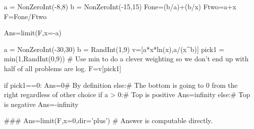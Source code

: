 
\begin{sagesilent}
a = NonZeroInt(-8,8)
b = NonZeroInt(-15,15)
Fone=(b/a)+(b/x)
Ftwo=a+x
F=Fone/Ftwo

Ans=limit(F,x=-a)
\end{sagesilent}



\begin{sagesilent}
a = NonZeroInt(-30,30)
b = RandInt(1,9)
v=[a*x*ln(x),a/(x^b)]
pick1 = min(1,RandInt(0,9)) # Use min to do a clever weighting so we don't end up with half of all problems are log.
F=v[pick1]

if pick1==0:
   Ans=0# By definition
else:# The bottom is going to 0 from the right regardless of other choice
   if a > 0:# Top is positive
      Ans=infinity
   else:# Top is negative
      Ans=-infinity

###  Ans=limit(F,x=0,dir='plus') # Answer is computable directly.
\end{sagesilent}



